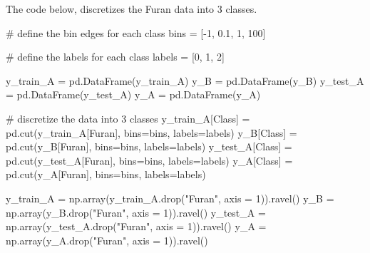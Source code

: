 \documentclass[
  letterpaper,
  DIV=11,
  numbers=noendperiod]{scrartcl}
\newenvironment{Shaded}{\begin{snugshade}}{\end{snugshade}}
\newcommand{\CommentTok}[1]{\textcolor[rgb]{0.37,0.37,0.37}{#1}}
\newcommand{\DecValTok}[1]{\textcolor[rgb]{0.68,0.00,0.00}{#1}}
\newcommand{\FloatTok}[1]{\textcolor[rgb]{0.68,0.00,0.00}{#1}}
\newcommand{\NormalTok}[1]{\textcolor[rgb]{0.00,0.23,0.31}{#1}}
\newcommand{\OperatorTok}[1]{\textcolor[rgb]{0.37,0.37,0.37}{#1}}
\newcommand{\StringTok}[1]{\textcolor[rgb]{0.13,0.47,0.30}{#1}}
\begin{document}
The code below, discretizes the Furan data into 3 classes.

\begin{Shaded}
\begin{Highlighting}[]
\CommentTok{\# define the bin edges for each class}
\NormalTok{bins }\OperatorTok{=}\NormalTok{ [}\OperatorTok{{-}}\DecValTok{1}\NormalTok{, }\FloatTok{0.1}\NormalTok{, }\DecValTok{1}\NormalTok{, }\DecValTok{100}\NormalTok{]}

\CommentTok{\# define the labels for each class}
\NormalTok{labels }\OperatorTok{=}\NormalTok{ [}\DecValTok{0}\NormalTok{, }\DecValTok{1}\NormalTok{, }\DecValTok{2}\NormalTok{]}

\NormalTok{y\_train\_A }\OperatorTok{=}\NormalTok{ pd.DataFrame(y\_train\_A)}
\NormalTok{y\_B }\OperatorTok{=}\NormalTok{ pd.DataFrame(y\_B)}
\NormalTok{y\_test\_A }\OperatorTok{=}\NormalTok{ pd.DataFrame(y\_test\_A)}
\NormalTok{y\_A }\OperatorTok{=}\NormalTok{ pd.DataFrame(y\_A)}

\CommentTok{\# discretize the data into 3 classes}
\NormalTok{y\_train\_A[}\StringTok{\textquotesingle{}Class\textquotesingle{}}\NormalTok{] }\OperatorTok{=}\NormalTok{ pd.cut(y\_train\_A[}\StringTok{\textquotesingle{}Furan\textquotesingle{}}\NormalTok{], bins}\OperatorTok{=}\NormalTok{bins, labels}\OperatorTok{=}\NormalTok{labels)}
\NormalTok{y\_B[}\StringTok{\textquotesingle{}Class\textquotesingle{}}\NormalTok{] }\OperatorTok{=}\NormalTok{ pd.cut(y\_B[}\StringTok{\textquotesingle{}Furan\textquotesingle{}}\NormalTok{], bins}\OperatorTok{=}\NormalTok{bins, labels}\OperatorTok{=}\NormalTok{labels)}
\NormalTok{y\_test\_A[}\StringTok{\textquotesingle{}Class\textquotesingle{}}\NormalTok{] }\OperatorTok{=}\NormalTok{ pd.cut(y\_test\_A[}\StringTok{\textquotesingle{}Furan\textquotesingle{}}\NormalTok{], bins}\OperatorTok{=}\NormalTok{bins, labels}\OperatorTok{=}\NormalTok{labels)}
\NormalTok{y\_A[}\StringTok{\textquotesingle{}Class\textquotesingle{}}\NormalTok{] }\OperatorTok{=}\NormalTok{ pd.cut(y\_A[}\StringTok{\textquotesingle{}Furan\textquotesingle{}}\NormalTok{], bins}\OperatorTok{=}\NormalTok{bins, labels}\OperatorTok{=}\NormalTok{labels)}

\NormalTok{y\_train\_A }\OperatorTok{=}\NormalTok{ np.array(y\_train\_A.drop(}\StringTok{"Furan"}\NormalTok{, axis }\OperatorTok{=} \DecValTok{1}\NormalTok{)).ravel()}
\NormalTok{y\_B }\OperatorTok{=}\NormalTok{ np.array(y\_B.drop(}\StringTok{"Furan"}\NormalTok{, axis }\OperatorTok{=} \DecValTok{1}\NormalTok{)).ravel()}
\NormalTok{y\_test\_A }\OperatorTok{=}\NormalTok{ np.array(y\_test\_A.drop(}\StringTok{"Furan"}\NormalTok{, axis }\OperatorTok{=} \DecValTok{1}\NormalTok{)).ravel()}
\NormalTok{y\_A }\OperatorTok{=}\NormalTok{ np.array(y\_A.drop(}\StringTok{"Furan"}\NormalTok{, axis }\OperatorTok{=} \DecValTok{1}\NormalTok{)).ravel()}
\end{Highlighting}
\end{Shaded}
\end{document}
